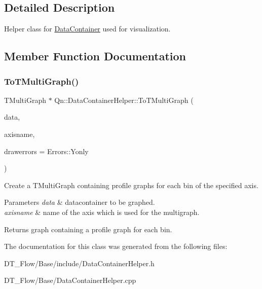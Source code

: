 \subsection{Detailed Description}
Helper class for \mbox{\hyperlink{classQn_1_1DataContainer}{Data\+Container}} used for visualization. 

\subsection{Member Function Documentation}
\mbox{\label{classQn_1_1DataContainerHelper_ab13b4b0c36c9bfe85dc0041f1f99271f}} 
\subsubsection{\texorpdfstring{To\+T\+Multi\+Graph()}{ToTMultiGraph()}}
{\footnotesize\ttfamily T\+Multi\+Graph $\ast$ Qn\+::\+Data\+Container\+Helper\+::\+To\+T\+Multi\+Graph (\begin{DoxyParamCaption}\item[{const \mbox{\hyperlink{classQn_1_1DataContainer}{Qn\+::\+Data\+Container}}$<$ \mbox{\hyperlink{classQn_1_1Stats}{Qn\+::\+Stats}} $>$ \&}]{data,  }\item[{const std\+::string \&}]{axisname,  }\item[{Errors}]{drawerrors = {\ttfamily Errors\+:\+:Yonly} }\end{DoxyParamCaption})\hspace{0.3cm}{\ttfamily [static]}}

Create a T\+Multi\+Graph containing profile graphs for each bin of the specified axis. 
\begin{DoxyParams}{Parameters}
{\em data} & datacontainer to be graphed. \\
\hline
{\em axisname} & name of the axis which is used for the multigraph. \\
\hline
\end{DoxyParams}
\begin{DoxyReturn}{Returns}
graph containing a profile graph for each bin. 
\end{DoxyReturn}


The documentation for this class was generated from the following files\+:\begin{DoxyCompactItemize}
\item 
D\+T\+\_\+\+Flow/\+Base/include/Data\+Container\+Helper.\+h\item 
D\+T\+\_\+\+Flow/\+Base/Data\+Container\+Helper.\+cpp\end{DoxyCompactItemize}
